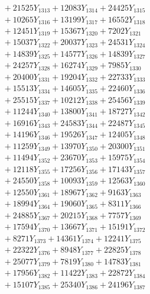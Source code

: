 \documentclass[a4paper,10pt]{article}
\begin{document}
{\begin{align}
&\;  + 21525 Y_{1313} + 12083 Y_{1314} + 24425 Y_{1315} \\[0.3ex]
&\;  + 10265 Y_{1316} + 13199 Y_{1317} + 16552 Y_{1318} \\[0.5ex]\allowbreak
&\;  + 12451 Y_{1319} + 15367 Y_{1320} + 7202 Y_{1321} \\[0.3ex]
&\;  + 15037 Y_{1322} + 20037 Y_{1323} + 24531 Y_{1324} \\[0.3ex]
&\;  + 14839 Y_{1325} + 14577 Y_{1326} + 14839 Y_{1327} \\[0.3ex]
&\;  + 24257 Y_{1328} + 16274 Y_{1329} + 7985 Y_{1330} \\[0.3ex]
&\;  + 20400 Y_{1331} + 19204 Y_{1332} + 22733 Y_{1333} \\[0.3ex]
&\;  + 15513 Y_{1334} + 14605 Y_{1335} + 22460 Y_{1336} \\[0.3ex]
&\;  + 25515 Y_{1337} + 10212 Y_{1338} + 25456 Y_{1339} \\[0.3ex]
&\;  + 11244 Y_{1340} + 13800 Y_{1341} + 18727 Y_{1342} \\[0.3ex]
&\;  + 16916 Y_{1343} + 24583 Y_{1344} + 22487 Y_{1345} \\[0.3ex]
&\;  + 14196 Y_{1346} + 19526 Y_{1347} + 12405 Y_{1348} \\[0.5ex]\allowbreak
&\;  + 11259 Y_{1349} + 13970 Y_{1350} + 20300 Y_{1351} \\[0.3ex]
&\;  + 11494 Y_{1352} + 23670 Y_{1353} + 15975 Y_{1354} \\[0.3ex]
&\;  + 12118 Y_{1355} + 17256 Y_{1356} + 17143 Y_{1357} \\[0.3ex]
&\;  + 24550 Y_{1358} + 10093 Y_{1359} + 12563 Y_{1360} \\[0.3ex]
&\;  + 12550 Y_{1361} + 18967 Y_{1362} + 9163 Y_{1363} \\[0.3ex]
&\;  + 18994 Y_{1364} + 19060 Y_{1365} + 8311 Y_{1366} \\[0.3ex]
&\;  + 24885 Y_{1367} + 20215 Y_{1368} + 7757 Y_{1369} \\[0.3ex]
&\;  + 17594 Y_{1370} + 13667 Y_{1371} + 15191 Y_{1372} \\[0.3ex]
&\;  + 8271 Y_{1373} + 14361 Y_{1374} + 12241 Y_{1375} \\[0.3ex]
&\;  + 22322 Y_{1376} + 8948 Y_{1377} + 22825 Y_{1378} \\[0.5ex]\allowbreak
&\;  + 25077 Y_{1379} + 7819 Y_{1380} + 14783 Y_{1381} \\[0.3ex]
&\;  + 17956 Y_{1382} + 11422 Y_{1383} + 22872 Y_{1384} \\[0.3ex]
&\;  + 15107 Y_{1385} + 25340 Y_{1386} + 24196 Y_{1387} \\[0.3ex]

\end{align}}
\end{document}
